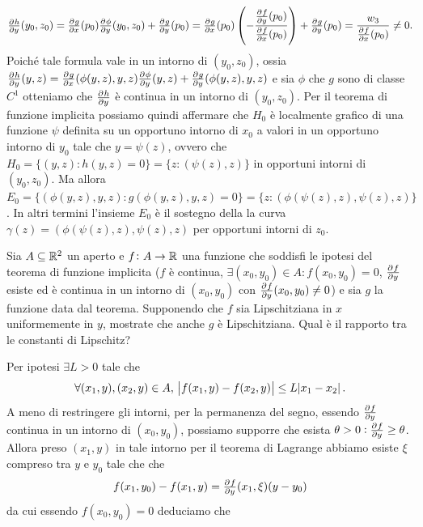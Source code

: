 \documentclass[a4paper]{article}\par \usepackage{style}\par
\begin{document}
\begin{equation*}
  \pd{h}{y}(y_0, z_0) = \pd{g}{x}(p_0) \pd{\phi}{y}(y_0, z_0) + \pd{g}{y}(p_0) = \pd{g}{x}(p_0) \left(-\frac{\pd{f}{y}(p_0)}{\pd{f}{x}(p_0)}\right) + \pd{g}{y}(p_0) = \frac{w_3}{\pd{f}{x}(p_0)} \neq 0.
\end{equation*}
Poiché tale formula vale in un intorno di $ (y_0, z_0) $, ossia $ \pd{h}{y}(y, z) = \pd{g}{x}(\phi(y, z), y, z) \pd{\phi}{y}(y, z) + \pd{g}{y}(\phi(y, z), y, z) $ e sia $ \phi $ che $ g $ sono di classe $ C^1 $ otteniamo che $ \pd{h}{y} $ è continua in un intorno di $ (y_0, z_0) $. Per il teorema di funzione implicita possiamo quindi affermare che $ H_0 $ è localmente grafico di una funzione $ \psi $ definita su un opportuno intorno di $ x_0 $ a valori in un opportuno intorno di $ y_0 $ tale che $ y = \psi(z) $, ovvero che $ H_0 = \{(y, z) : h(y, z) = 0\} = \{z : (\psi(z), z)\} $ in opportuni intorni di $ (y_0, z_0) $. Ma allora $ E_0 = \{(\phi(y, z), y, z) : g(\phi(y, z), y, z) = 0\} = \{z : (\phi(\psi(z), z), \psi(z), z)\} $. In altri termini l'insieme $ E_0 $ è il sostegno della la curva $ \gamma(z) = (\phi(\psi(z), z), \psi(z), z) $ per opportuni intorni di $ z_0 $.\par 
\begin{es}
  Sia $ A \subseteq \mathbb{R}^2 $ un aperto e $ f \colon A \to \mathbb{R} $ una funzione che soddisfi le ipotesi del teorema di funzione implicita ($ f $ è continua, $ \exists (x_0, y_0) \in A : f(x_0, y_0) = 0 $, $ \pd{f}{y} $ esiste ed è continua in un intorno di $ (x_0, y_0) $ con $ \pd{f}{y}(x_0, y_0) \neq 0 $) e sia $ g $ la funzione data dal teorema. Supponendo che $ f $ sia Lipschitziana in $ x $ uniformemente in $ y $, mostrate che anche $ g $ è Lipschitziana. Qual è il rapporto tra le constanti di Lipschitz?
\end{es}\par Per ipotesi $ \exists L > 0 $ tale che \[\forall (x_1, y), (x_2, y) \in A, \ \abs{f(x_1, y) - f(x_2, y)} \leq L \abs{x_1 - x_2}.\] A meno di restringere gli intorni, per la permanenza del segno, essendo $ \pd{f}{y} $ continua in un intorno di $ (x_0, y_0) $, possiamo supporre che esista $ \theta > 0 : \pd{f}{y} \geq \theta $. Allora preso $ (x_1, y) $ in tale intorno per il teorema di Lagrange abbiamo esiste $ \xi $ compreso tra $ y $ e $ y_0 $ tale che che \[f(x_1, y_0) - f(x_1, y) = \pd{f}{y}(x_1, \xi)(y - y_0)\] da cui essendo $ f(x_0, y_0) = 0 $ deduciamo che
\end{document}
